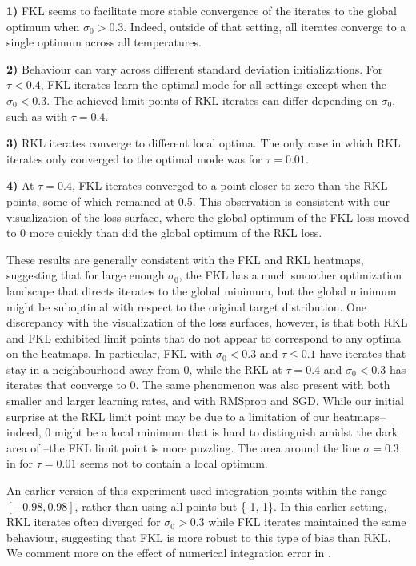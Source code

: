 \documentclass[\main/thesis.tex]{subfiles}
\begin{document}
\textbf{1)} FKL seems to facilitate more stable convergence of the iterates to the global optimum when $\sigma_0 > 0.3$. Indeed, outside of that setting, all iterates converge to a single optimum across all temperatures. 

\textbf{2)} Behaviour can vary across different standard deviation initializations. For $\tau < 0.4$, FKL iterates learn the optimal mode for all settings except when the $\sigma_0 < 0.3$. The achieved limit points of RKL iterates can differ depending on $\sigma_0$, such as with $\tau = 0.4$. 

\textbf{3)} RKL iterates converge to different local optima. The only case in which RKL iterates only converged to the optimal mode was for $\tau = 0.01$. 

\textbf{4)} At $\tau = 0.4$, FKL iterates converged to a point closer to zero than the RKL points, some of which remained at 0.5. This observation is consistent with our visualization of the loss surface, where the global optimum of the FKL loss moved to 0 more quickly than did the global optimum of the RKL loss. 
% 

These results are generally consistent with the FKL and RKL heatmaps, suggesting that for large enough $\sigma_0$, the FKL has a much smoother optimization landscape that directs iterates to the global minimum, but the global minimum might be suboptimal with respect to the original target distribution. One discrepancy with the visualization of the loss surfaces, however, is that both RKL and FKL exhibited limit points that do not appear to correspond to any optima on the heatmaps. In particular, FKL with $\sigma_0 < 0.3$ and $\tau \leq 0.1$ have iterates that stay in a neighbourhood away from 0, while the RKL at $\tau = 0.4$ and $\sigma_0 < 0.3$ has iterates that converge to 0. The same phenomenon was also present with both smaller and larger learning rates, and with RMSprop and SGD. While our initial surprise at the RKL limit point may be due to a limitation of our heatmaps--indeed, 0 might be a local minimum that is hard to distinguish amidst the dark area of --the FKL limit point is more puzzling. The area around the line $\sigma = 0.3$ in  for $\tau = 0.01$ seems not to contain a local optimum. 

An earlier version of this experiment used integration points within the range $[-0.98, 0.98]$, rather than using all points but \{-1, 1\}. In this earlier setting, RKL iterates often diverged for $\sigma_0 > 0.3$ while FKL iterates maintained the same behaviour, suggesting that FKL is more robust to this type of bias than RKL. We comment more on the effect of numerical integration error in . %
\end{document}
